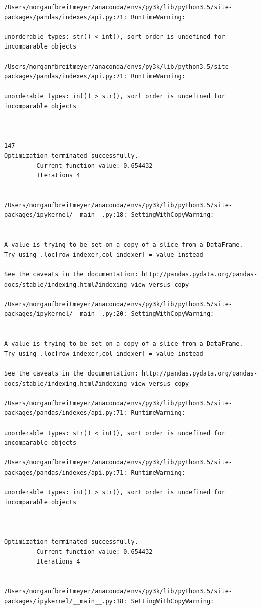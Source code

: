 \begin{lstlisting}
/Users/morganfbreitmeyer/anaconda/envs/py3k/lib/python3.5/site-packages/pandas/indexes/api.py:71: RuntimeWarning:

unorderable types: str() < int(), sort order is undefined for incomparable objects

/Users/morganfbreitmeyer/anaconda/envs/py3k/lib/python3.5/site-packages/pandas/indexes/api.py:71: RuntimeWarning:

unorderable types: int() > str(), sort order is undefined for incomparable objects



147
Optimization terminated successfully.
         Current function value: 0.654432
         Iterations 4


/Users/morganfbreitmeyer/anaconda/envs/py3k/lib/python3.5/site-packages/ipykernel/__main__.py:18: SettingWithCopyWarning:


A value is trying to be set on a copy of a slice from a DataFrame.
Try using .loc[row_indexer,col_indexer] = value instead

See the caveats in the documentation: http://pandas.pydata.org/pandas-docs/stable/indexing.html#indexing-view-versus-copy

/Users/morganfbreitmeyer/anaconda/envs/py3k/lib/python3.5/site-packages/ipykernel/__main__.py:20: SettingWithCopyWarning:


A value is trying to be set on a copy of a slice from a DataFrame.
Try using .loc[row_indexer,col_indexer] = value instead

See the caveats in the documentation: http://pandas.pydata.org/pandas-docs/stable/indexing.html#indexing-view-versus-copy

/Users/morganfbreitmeyer/anaconda/envs/py3k/lib/python3.5/site-packages/pandas/indexes/api.py:71: RuntimeWarning:

unorderable types: str() < int(), sort order is undefined for incomparable objects

/Users/morganfbreitmeyer/anaconda/envs/py3k/lib/python3.5/site-packages/pandas/indexes/api.py:71: RuntimeWarning:

unorderable types: int() > str(), sort order is undefined for incomparable objects



Optimization terminated successfully.
         Current function value: 0.654432
         Iterations 4


/Users/morganfbreitmeyer/anaconda/envs/py3k/lib/python3.5/site-packages/ipykernel/__main__.py:18: SettingWithCopyWarning:



\end{lstlisting}
